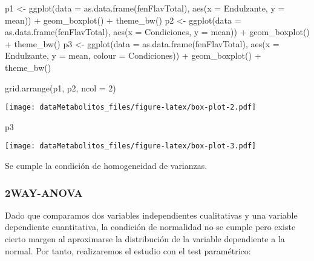 \documentclass[
]{article}
\newenvironment{Shaded}{\begin{snugshade}}{\end{snugshade}}
\newcommand{\AttributeTok}[1]{\textcolor[rgb]{0.77,0.63,0.00}{#1}}
\newcommand{\DecValTok}[1]{\textcolor[rgb]{0.00,0.00,0.81}{#1}}
\newcommand{\FunctionTok}[1]{\textcolor[rgb]{0.00,0.00,0.00}{#1}}
\newcommand{\NormalTok}[1]{#1}
\newcommand{\OtherTok}[1]{\textcolor[rgb]{0.56,0.35,0.01}{#1}}
\newcommand{\SpecialCharTok}[1]{\textcolor[rgb]{0.00,0.00,0.00}{#1}}
\begin{document}
\begin{Shaded}
\begin{Highlighting}[]
\NormalTok{p1 }\OtherTok{\textless{}{-}} \FunctionTok{ggplot}\NormalTok{(}\AttributeTok{data =} \FunctionTok{as.data.frame}\NormalTok{(fenFlavTotal), }\FunctionTok{aes}\NormalTok{(}\AttributeTok{x =}\NormalTok{ Endulzante, }\AttributeTok{y =}\NormalTok{ mean)) }\SpecialCharTok{+} 
  \FunctionTok{geom\_boxplot}\NormalTok{() }\SpecialCharTok{+} \FunctionTok{theme\_bw}\NormalTok{()}
\NormalTok{p2 }\OtherTok{\textless{}{-}} \FunctionTok{ggplot}\NormalTok{(}\AttributeTok{data =} \FunctionTok{as.data.frame}\NormalTok{(fenFlavTotal), }\FunctionTok{aes}\NormalTok{(}\AttributeTok{x =}\NormalTok{ Condiciones, }\AttributeTok{y =}\NormalTok{ mean)) }\SpecialCharTok{+}
  \FunctionTok{geom\_boxplot}\NormalTok{() }\SpecialCharTok{+} \FunctionTok{theme\_bw}\NormalTok{()}
\NormalTok{p3 }\OtherTok{\textless{}{-}} \FunctionTok{ggplot}\NormalTok{(}\AttributeTok{data =} \FunctionTok{as.data.frame}\NormalTok{(fenFlavTotal), }\FunctionTok{aes}\NormalTok{(}\AttributeTok{x =}\NormalTok{ Endulzante, }\AttributeTok{y =}\NormalTok{ mean, }\AttributeTok{colour =}\NormalTok{ Condiciones)) }\SpecialCharTok{+}
  \FunctionTok{geom\_boxplot}\NormalTok{() }\SpecialCharTok{+} \FunctionTok{theme\_bw}\NormalTok{()}

\FunctionTok{grid.arrange}\NormalTok{(p1, p2, }\AttributeTok{ncol =} \DecValTok{2}\NormalTok{)}
\end{Highlighting}
\end{Shaded}

\texttt{[image: dataMetabolitos\_files/figure-latex/box-plot-2.pdf]}

\begin{Shaded}
\begin{Highlighting}[]
\NormalTok{p3}
\end{Highlighting}
\end{Shaded}

\texttt{[image: dataMetabolitos\_files/figure-latex/box-plot-3.pdf]}

Se cumple la condición de homogeneidad de varianzas.

\hypertarget{way-anova}{%
\subsubsection{2WAY-ANOVA}\label{way-anova}}

Dado que comparamos dos variables independientes cualitativas y una
variable dependiente cuantitativa, la condición de normalidad no se
cumple pero existe cierto margen al aproximarse la distribución de la
variable dependiente a la normal. Por tanto, realizaremos el estudio con
el test paramétrico:
\end{document}
